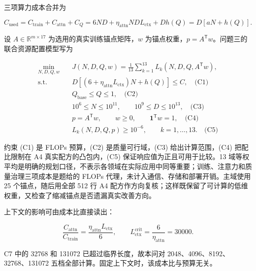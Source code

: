 三项算力成本合并为

\begin{equation}\label{eq:q3_8}
    C_{\mathrm{used}}=C_{\mathrm{train}}+C_{\mathrm{attn}}+C_Q
    =6ND+\eta_{\mathrm{attn}}NDL_{\mathrm{ctx}}+Dh(Q)
    =D[aN+h(Q)].
\end{equation}

设 $A\in\mathbb R^{m\times17}$ 为选用的真实训练锚点矩阵，$w$ 为锚点权重，$p=A^{\mathsf T}w$。问题三的联合资源配置模型写为

\begin{equation}\label{eq:q3_9}
    \begin{aligned}
        \min_{N,D,Q,w}\quad & J(N,D,Q,w)=\frac{1}{13}\sum_{k=1}^{13}L_k(N,D,Q,A^{\mathsf T}w),                   \\
        \mathrm{s.t.}\quad
                            & D\left[(6+\eta_{\mathrm{attn}}L_{\mathrm{ctx}})N+h(Q)\right]\le C,\quad\text{(C1)} \\
                            & Q_{\mathrm{base}}\le Q\le1,\quad\text{(C2)}                                        \\
                            & 10^6\le N\le10^{11},\qquad 10^9\le D\le10^{13},\quad\text{(C3)}                    \\
                            & p=A^{\mathsf T}w,\qquad w\ge0,\qquad \mathbf1^{\mathsf T}w=1,\quad\text{(C4)}      \\
                            & L_k(N,D,Q,p)\ge10^{-6},\qquad k=1,\ldots,13.\quad\text{(C5)}
    \end{aligned}
\end{equation}

约束 (C1) 是 FLOPs 预算，(C2) 是质量可行域，(C3) 给出计算范围，(C4) 把配比限制在 A4 真实配方的凸包内，(C5) 保证响应值为正且可用于比较。13 域等权平均是明确的规划口径，不表示各领域在实际应用中同等重要；训练、注意力和质量治理三项成本是题给的 FLOPs 代理，未计入通信、存储和部署开销。主域使用 25 个锚点，随后用全部 512 行 A4 配方作方向复核；这样既保留了可计算的低维权重，又检查了缩减锚点是否遗漏真实改善方向。

上下文的影响可由成本比直接读出：

\begin{equation}\label{eq:q3_10}
    \frac{C_{\mathrm{attn}}}{C_{\mathrm{train}}}
    =\frac{\eta_{\mathrm{attn}}L_{\mathrm{ctx}}}{6},\qquad
    L_{\mathrm{ctx}}^{\mathrm{crit}}=\frac{6}{\eta_{\mathrm{attn}}}=30000.
\end{equation}

C7 中的 32768 和 131072 已超过临界长度，故本问对 2048、4096、8192、32768、131072 五档全部计算。固定上下文时，该成本比与预算无关。

